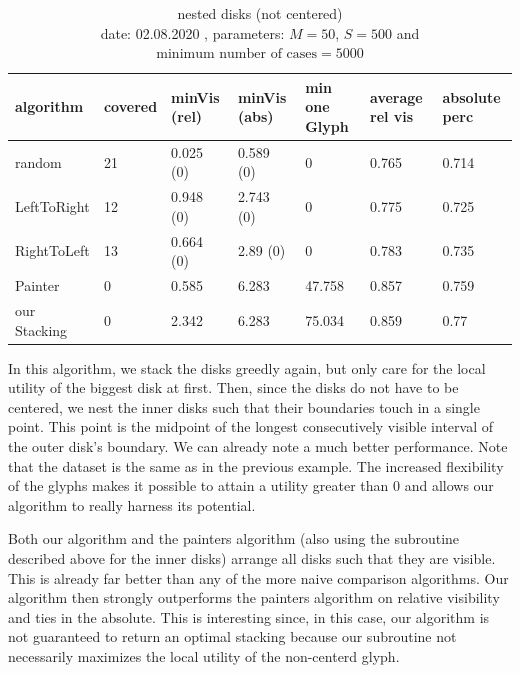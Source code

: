 \documentclass[a4paper,11pt]{article}
\begin{document}
\begin{table}[!h]
  \begin{center}
    \begin{tabular}{| l || p{1.3cm} | p{1.7cm} | p{1.7cm} | p{1.5cm} | p{1.5cm} | p{1.5cm} |}
      \hline
      algorithm    & covered & minVis (rel) & minVis (abs) & min one Glyph & average rel vis & absolute perc \\
      \hline
      random       & 21      & 0.025 (0)    & 0.589 (0)    & 0             & 0.765           & 0.714         \\

      LeftToRight  & 12      & 0.948 (0)    & 2.743 (0)    & 0             & 0.775           & 0.725         \\

      RightToLeft  & 13      & 0.664 (0)    & 2.89 (0)     & 0             & 0.783           & 0.735         \\

      Painter      & 0       & 0.585        & 6.283        & 47.758        & 0.857           & 0.759         \\

      our Stacking & 0       & 2.342        & 6.283        & 75.034        & 0.859           & 0.77          \\

      \hline
    \end{tabular}
  \end{center}
  \caption{nested disks (not centered)\\
    date: 02.08.2020  , parameters: $M=50$, $S=500$ and $\text{minimum number of cases}=5000$  }
\end{table}

In this algorithm, we stack the disks greedly again, but only care for the local utility of the biggest disk at first. Then, since the disks do not have to be centered, we nest the inner disks such that their boundaries touch in a single point. This point is the midpoint of the longest consecutively visible interval of the outer disk's boundary. We can already note a much better performance. Note that the dataset is the same as in the previous example. The increased flexibility of the glyphs makes it possible to attain a utility greater than $0$ and allows our algorithm to really harness its potential.

Both our algorithm and the painters algorithm (also using the subroutine described above for the inner disks) arrange all disks such that they are visible. This is already far better than any of the more naive comparison algorithms. Our algorithm then strongly outperforms the painters algorithm on relative visibility and ties in the absolute. This is interesting since, in this case, our algorithm is not guaranteed to return an optimal stacking because our subroutine not necessarily maximizes the local utility of the non-centerd glyph.
\end{document}
